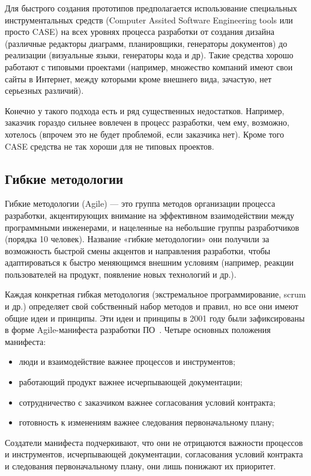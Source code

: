 Для быстрого создания прототипов предполагается использование специальных инструментальных средств (Computer Assited Software Engineering tools или просто CASE) на всех уровнях процесса разработки от создания дизайна (различные редакторы диаграмм, планировщики, генераторы документов) до реализации (визуальные языки, генераторы кода и др). Такие средства хорошо работают с типовыми проектами (например, множество компаний имеют свои сайты в Интернет, между которыми кроме внешнего вида, зачастую, нет серьезных различий).

Конечно у такого подхода есть и ряд существенных недостатков. Например, заказчик гораздо сильнее вовлечен в процесс разработки, чем ему, возможно, хотелось (впрочем это не будет проблемой, если заказчика нет). Кроме того CASE средства не так хороши для не типовых проектов.

\subsection{Гибкие методологии}

Гибкие методологии (Agile) — это группа методов организации процесса разработки, акцентирующих внимание на эффективном взаимодействии между программными инженерами, и нацеленные на небольшие группы разработчиков (порядка 10 человек). Название «гибкие методологии» они получили за возможность быстрой смены акцентов и направления разработки, чтобы адаптироваться к быстро меняющимся внешним условиям (например, реакции пользователей на продукт, появление новых технологий и др.).

Каждая конкретная гибкая методология (экстремальное программирование, scrum и др.) определяет свой собственный набор методов и правил, но все они имеют общие идеи и принципы. Эти идеи и принципы в 2001 году были зафиксированы в форме Agile-манифеста разработки ПО~\cite{Agile}. Четыре основных положения манифеста:
\begin{itemize}
  \item люди и взаимодействие важнее процессов и инструментов;
  \item работающий продукт важнее исчерпывающей документации;
  \item сотрудничество с заказчиком важнее согласования условий контракта;
  \item готовность к изменениям важнее следования первоначальному плану;
\end{itemize}

Создатели манифеста подчеркивают, что они не отрицаются важности процессов и инструментов, исчерпывающей документации, согласования условий контракта и следования первоначальному плану, они лишь понижают их приоритет.
